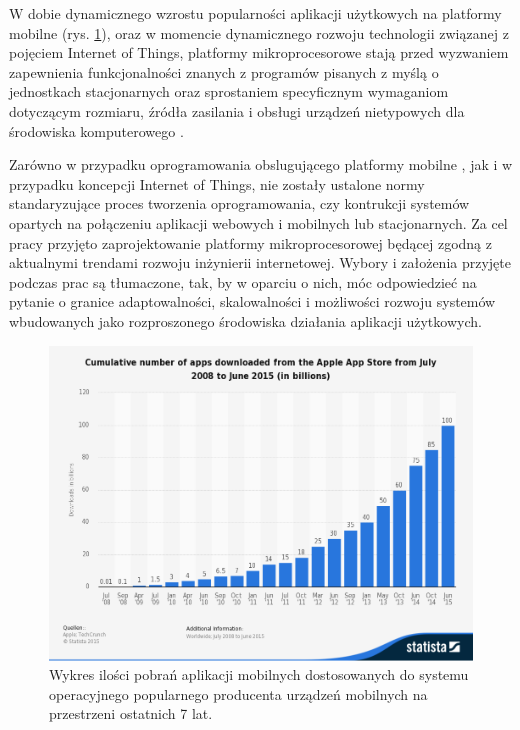 W dobie dynamicznego wzrostu popularności aplikacji użytkowych na platformy mobilne (rys. \ref{figure:app_download}), oraz w momencie dynamicznego rozwoju technologii związanej z pojęciem Internet of Things, platformy mikroprocesorowe stają przed wyzwaniem zapewnienia funkcjonalności znanych z programów pisanych z myślą o jednostkach stacjonarnych oraz sprostaniem specyficznym wymaganiom dotyczącym rozmiaru, źródła zasilania i obsługi urządzeń nietypowych dla środowiska komputerowego .

Zarówno w przypadku oprogramowania obslugującego platformy mobilne \cite{bib:mobile-challenge}, jak i w przypadku koncepcji Internet of Things, nie zostały ustalone normy standaryzujące proces tworzenia oprogramowania, czy kontrukcji systemów opartych na połączeniu aplikacji webowych i mobilnych lub stacjonarnych. Za cel pracy przyjęto zaprojektowanie platformy mikroprocesorowej będącej zgodną z aktualnymi trendami rozwoju inżynierii internetowej. Wybory i założenia przyjęte podczas prac są tłumaczone, tak, by w oparciu o nich, móc odpowiedzieć na pytanie o granice adaptowalności, skalowalności i możliwości rozwoju systemów wbudowanych jako rozproszonego środowiska działania aplikacji użytkowych.

\begin{figure}[ht]
  \centering
  \includegraphics[width=\textwidth]{images/app_downloads.png}
  \caption{Wykres ilości pobrań aplikacji mobilnych dostosowanych do systemu operacyjnego popularnego producenta urządzeń mobilnych na przestrzeni ostatnich 7 lat.}
  \label{figure:app_download}
\end{figure}
\FloatBarrier



